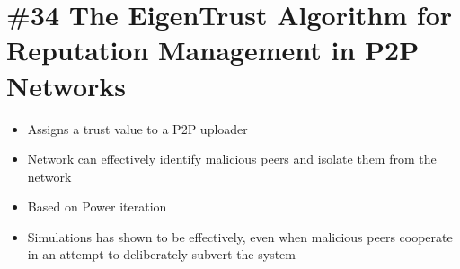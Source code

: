\section{\#34 The EigenTrust Algorithm for Reputation Management in P2P Networks}
\begin{itemize}
	\item Assigns a trust value to a P2P uploader
	\item Network can effectively identify malicious peers and isolate them from the network
	\item Based on Power iteration
	\item Simulations has shown to be effectively, even when malicious peers cooperate in an attempt to deliberately subvert the system
\end{itemize}